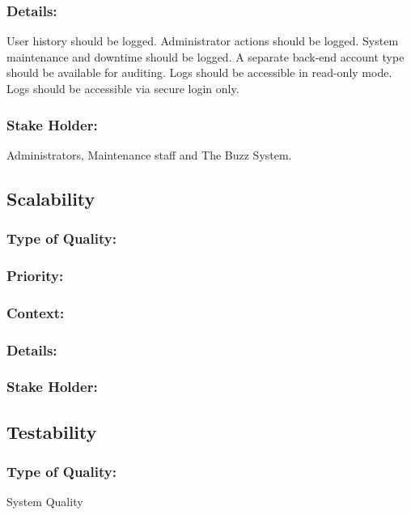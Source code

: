\documentclass[11pt]{article}
\begin{document}
		\subsubsection{Details:}
			\textbf{}User history should be logged. Administrator actions should be logged. System maintenance and downtime should be logged. A separate back-end account type should be available for auditing. Logs should be accessible in read-only mode. Logs should be accessible via secure login only.
		
		\subsubsection{Stake Holder:}
			\textbf{}Administrators, Maintenance staff and The Buzz System.
	
	\subsection{Scalability}	
		\subsubsection{Type of Quality:}
			\textbf{}
		
		\subsubsection{Priority:}
			\textbf{}

		\subsubsection{Context:}
			\textbf{}
		
		\subsubsection{Details:}
			\textbf{}
		
		\subsubsection{Stake Holder:}
			\textbf{}
	
	\subsection{Testability}
	
		\subsubsection{Type of Quality:}
			\textbf{} System Quality
		
\end{document}
